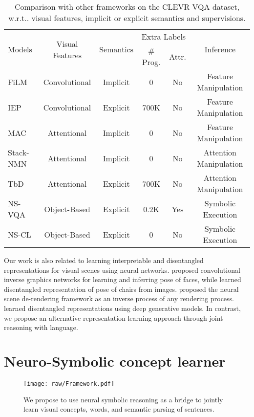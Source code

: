 \documentclass{article} \usepackage{iclr2019_conference,times}
\makeatletter
\DeclareRobustCommand\onedot{\futurelet\@let@token\@onedot}
\def\@onedot{\ifx\@let@token.\else.\null\fi\xspace}
\def\wrt{w.r.t\onedot} \def\dof{d.o.f\onedot}
\newcommand{\model}{NS-CL\xspace}
\makeatother
\begin{document}
\begin{table}[t]
\centering\small
    \setlength{\tabcolsep}{4pt}
    \begin{tabular}{lccccc}
        \toprule
        \multirow{2}{*}{Models} & \multirow{2}{*}{Visual Features} & \multirow{2}{*}{Semantics} & \multicolumn{2}{c}{Extra Labels} & \multirow{2}{*}{Inference} \\ 
        \cmidrule{4-5}
        & & & \# Prog. & Attr. & \\
        \midrule
        FiLM \citep{Perez2017Film} & Convolutional & Implicit & 0 & No & Feature Manipulation\\
        IEP \citep{Johnson2017Inferring} & Convolutional & Explicit & 700K & No &  Feature Manipulation\\
        \midrule
        MAC \citep{Hudson2018Compositional} & Attentional & Implicit & 0 & No & Feature Manipulation\\
        Stack-NMN \citep{Hu2018Explainable} & Attentional & Implicit & 0 & No &  Attention Manipulation\\
        TbD \citep{Mascharka2018Transparency} & Attentional & Explicit & 700K & No &  Attention Manipulation\\
        \midrule
        NS-VQA \citep{kexin} & Object-Based & Explicit & 0.2K & Yes & Symbolic Execution\\ 
        \model & Object-Based & Explicit & 0 & No & Symbolic Execution \\
        \bottomrule
    \end{tabular}
    \caption{Comparison with other frameworks on the CLEVR VQA dataset, \wrt visual features, implicit or explicit semantics and supervisions.}
\label{tab:related-vqa}
\end{table} 
Our work is also related to learning interpretable and disentangled representations for visual scenes using neural networks. \citet{kulkarni2015deep} proposed convolutional inverse graphics networks for learning and inferring pose of faces, while \citet{Yang2015Weakly} learned disentangled representation of pose of chairs from images. \citet{Wu2017Neural} proposed the neural scene de-rendering framework as an inverse process of any rendering process. \citet{Siddharth2017Learning,Higgins2018SCAN} learned disentangled representations using deep generative models. In contrast, we propose an alternative representation learning approach through joint reasoning with language.

\section{Neuro-Symbolic concept learner}
\begin{figure}[t]
\centering
\texttt{[image: raw/Framework.pdf]}
\caption{We propose to use neural symbolic reasoning as a bridge to jointly learn visual concepts, words, and semantic parsing of sentences.}
\vspace{-5pt}
\label{fig:framework}
\end{figure}
 
\end{document}
